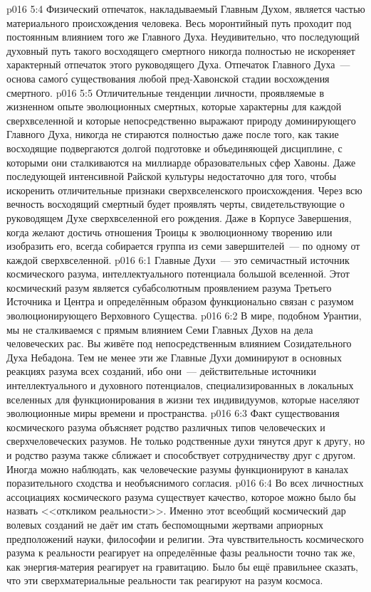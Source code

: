 \vs p016 5:4 Физический отпечаток, накладываемый Главным Духом, является частью материального происхождения человека. Весь моронтийный путь проходит под постоянным влиянием того же Главного Духа. Неудивительно, что последующий духовный путь такого восходящего смертного никогда полностью не искореняет характерный отпечаток этого руководящего Духа. Отпечаток Главного Духа~--- основа самог\'о существования любой пред\hyp{}Хавонской стадии восхождения смертного.
\vs p016 5:5 Отличительные тенденции личности, проявляемые в жизненном опыте эволюционных смертных, которые характерны для каждой сверхвселенной и которые непосредственно выражают природу доминирующего Главного Духа, никогда не стираются полностью даже после того, как такие восходящие подвергаются долгой подготовке и объединяющей дисциплине, с которыми они сталкиваются на миллиарде образовательных сфер Хавоны. Даже последующей интенсивной Райской культуры недостаточно для того, чтобы искоренить отличительные признаки сверхвселенского происхождения. Через всю вечность восходящий смертный будет проявлять черты, свидетельствующие о руководящем Духе сверхвселенной его рождения. Даже в Корпусе Завершения, когда желают достичь  отношения Троицы к эволюционному творению или изобразить его, всегда собирается группа из семи завершителей~--- по одному от каждой сверхвселенной.
\vs p016 6:1 Главные Духи~--- это семичастный источник космического разума, интеллектуального потенциала большой вселенной. Этот космический разум является субабсолютным проявлением разума Третьего Источника и Центра и определённым образом функционально связан с разумом эволюционирующего Верховного Существа.
\vs p016 6:2 В мире, подобном Урантии, мы не сталкиваемся с прямым влиянием Семи Главных Духов на дела человеческих рас. Вы живёте под непосредственным влиянием Созидательного Духа Небадона. Тем не менее эти же Главные Духи доминируют в основных реакциях разума всех созданий, ибо они~--- действительные источники интеллектуального и духовного потенциалов, специализированных в локальных вселенных для функционирования в жизни тех индивидуумов, которые населяют эволюционные миры времени и пространства.
\vs p016 6:3 Факт существования космического разума объясняет родство различных типов человеческих и сверхчеловеческих разумов. Не только родственные духи тянутся друг к другу, но и родство разума также сближает и способствует сотрудничеству друг с другом. Иногда можно наблюдать, как человеческие разумы функционируют в каналах поразительного сходства и необъяснимого согласия.
\vs p016 6:4 \pc Во всех личностных ассоциациях космического разума существует качество, которое можно было бы назвать <<откликом реальности>>. Именно этот всеобщий космический дар волевых созданий не даёт им стать беспомощными жертвами априорных предположений науки, философии и религии. Эта чувствительность космического разума к реальности реагирует на определённые фазы реальности точно так же, как энергия\hyp{}материя реагирует на гравитацию. Было бы ещё правильнее сказать, что эти сверхматериальные реальности так реагируют на разум космоса.
